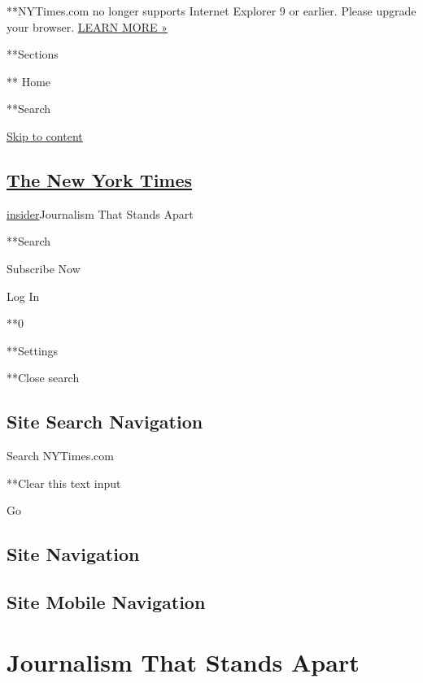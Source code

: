  **NYTimes.com no longer supports Internet Explorer 9 or earlier. Please
upgrade your browser.
\href{https://www.nytimes3xbfgragh.onion/content/help/site/ie9-support.html}{LEARN
MORE »}

**Sections

** Home

**Search

\href{https://www.nytimes3xbfgragh.onion/projects/2020-report/index.html\#main}{Skip
to content}

\hypertarget{the-new-york-times}{%
\subsection{\texorpdfstring{\href{https://www.nytimes3xbfgragh.onion/}{The
New York Times}}{The New York Times}}\label{the-new-york-times}}

\href{}{insider}\textbar{}Journalism That Stands Apart

**Search

Subscribe Now

Log In

**0

**Settings

**Close search

\hypertarget{site-search-navigation}{%
\subsection{Site Search Navigation}\label{site-search-navigation}}

Search NYTimes.com

**Clear this text input

Go

\hypertarget{site-navigation}{%
\subsection{Site Navigation}\label{site-navigation}}

\hypertarget{site-mobile-navigation}{%
\subsection{Site Mobile Navigation}\label{site-mobile-navigation}}

\hypertarget{journalism-that-stands-apart}{%
\section{Journalism That Stands
Apart}\label{journalism-that-stands-apart}}

